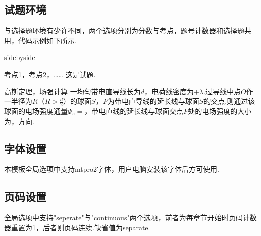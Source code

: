 {\subsection{试题环境}
与选择题环境有少许不同，两个选项分别为分数与考点，题号计数器和选择题共用，代码示例如下所示.
\begin{tcblisting}{sidebyside}
    \begin{exercise}{5}{考点1，考点2，……}
        这是试题.
    \end{exercise}
\end{tcblisting}
    \hspace{-2.16em}
    \begin{minipage}{0.67\textwidth}
        \vspace{1em}
    \begin{exercise}[6]{高斯定理，场强计算}
        一均匀带电直导线长为$d$，电荷线密度为$+\lambda$.过导线中点$O$作一半径为$R$（$R>\frac{d}{2}$）的球面$S$，$P$为带电直导线的延长线与球面$S$的交点.则通过该球面的电场强度通量$\Phi_e=$，带电直线的延长线与球面交点$P$处的电场强度的大小为，方向.
    \end{exercise}
    \end{minipage}
    \hfill
    \begin{minipage}[c]{0.33\textwidth}
    \begin{center}
    \end{center}
    \end{minipage}

\subsection{字体设置}
本模板全局选项中支持mtpro2字体，用户电脑安装该字体后方可使用.
\subsection{页码设置}
全局选项中支持"seperate"与"continuous"两个选项，前者为每章节开始时页码计数器重置为1，后者则页码连续.缺省值为separate.
}
\newpage
